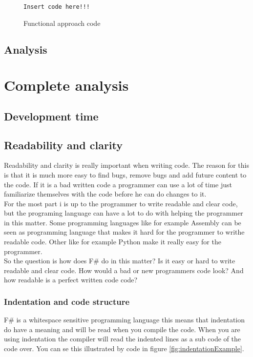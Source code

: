 \documentclass[12pt, a4paper]{article}
\begin{document}
\begin{figure}[!h]
\begin{lstlisting}
Insert code here!!!
\end{lstlisting}
\caption{Functional approach code}
\end{figure}

\newpage

\subsection{Analysis}
\newpage

\section{Complete analysis}
\subsection{Development time}

\newpage
\subsection{Readability and clarity}
Readability and clarity is really important when writing code. The reason for this is that it is much more easy to find bugs, remove bugs and add future content to the code. If it is a bad written code a programmer can use a lot of time just familiarize themselves with the code before he can do changes to it.\\

For the most part i is up to the programmer to write readable and clear code, but the programing language can have a lot to do with helping the programmer in this matter. Some programming languages like for example Assembly can be seen as programming language that makes it hard for the programmer to writhe readable code. Other like for example Python make it really easy for the programmer.\\

So the question is how does F\# do in this matter? Is it easy or hard to write readable and clear code. How would a bad or new programmers code look? And how readable is a perfect written code code?

\newpage
\subsubsection{Indentation and code structure}
F\# is a whitespace sensitive programming language this means that indentation do have a meaning and will be read when you compile the code. When you are using indentation the compiler will read the indented lines as a sub code of the code over. You can se this illustrated by code in figure \ref{fig:indentationExample}.
\end{document}
